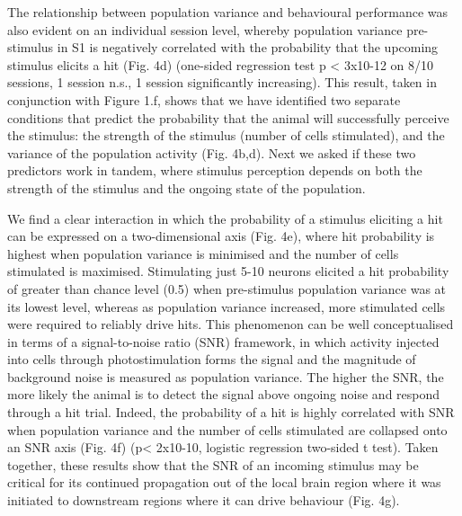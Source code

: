 The relationship between population variance and behavioural performance was also evident on an individual session level, whereby population variance pre-stimulus in S1 is negatively correlated with the probability that the upcoming stimulus elicits a hit (Fig. 4d) (one-sided regression test p < 3x10-12 on 8/10 sessions, 1 session n.s., 1 session significantly increasing). This result, taken in conjunction with Figure 1.f, shows that we have identified two separate conditions that predict the probability that the animal will successfully perceive the stimulus: the strength of the stimulus (number of cells stimulated), and the variance of the population activity (Fig. 4b,d). Next we asked if these two predictors work in tandem, where stimulus perception depends on both the strength of the stimulus and the ongoing state of the population.

We find a clear interaction in which the probability of a stimulus eliciting a hit can be expressed on a two-dimensional axis (Fig. 4e), where hit probability is highest when population variance is minimised and the number of cells stimulated is maximised. Stimulating just 5-10 neurons elicited a hit probability of greater than chance level (0.5) when pre-stimulus population variance was at its lowest level, whereas as population variance increased, more stimulated cells were required to reliably drive hits. This phenomenon can be well conceptualised in terms of a signal-to-noise ratio (SNR) framework, in which activity injected into cells through photostimulation forms the signal and the magnitude of background noise is measured as population variance. The higher the SNR, the more likely the animal is to detect the signal above ongoing noise and respond through a hit trial. Indeed, the probability of a hit is highly correlated with SNR when population variance and the number of cells stimulated are collapsed onto an SNR axis (Fig. 4f) (p< 2x10-10, logistic regression two-sided t test). Taken together, these results show that the SNR of an incoming stimulus may be critical for its continued propagation out of the local brain region where it was initiated to downstream regions where it can drive behaviour (Fig. 4g).